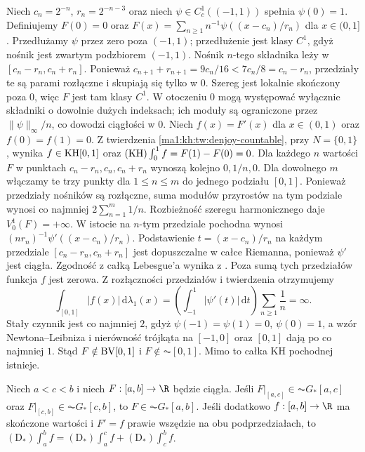 \begin{przyklad}
Niech $c_n=2^{-n}$, $r_n=2^{-n-3}$ oraz niech $\psi\in C_c^1((-1,1))$ spełnia $\psi(0)=1$. Definiujemy
$F(0)=0$ oraz $F(x)=\sum_{n\ge1}n^{-1}\psi((x-c_n)/r_n)$ dla $x\in(0,1]$. Przedłużamy $\psi$ przez zero poza $(-1,1)$; przedłużenie jest klasy $C^1$, gdyż nośnik jest zwartym podzbiorem $(-1,1)$. Nośnik $n$-tego składnika leży w $[c_n-r_n,c_n+r_n]$. Ponieważ $c_{n+1}+r_{n+1}=9c_n/16<7c_n/8=c_n-r_n$, przedziały te są parami rozłączne i skupiają się tylko w $0$. Szereg jest lokalnie skończony poza $0$, więc $F$ jest tam klasy $C^1$. W otoczeniu $0$ mogą występować wyłącznie składniki o dowolnie dużych indeksach; ich moduły są ograniczone przez $\|\psi\|_\infty/n$, co dowodzi ciągłości w $0$. Niech $f(x)=F'(x)$ dla $x\in(0,1)$ oraz $f(0)=f(1)=0$.
Z twierdzenia \ref{ma1:kh:tw:denjoy-countable}, przy $N=\{0,1\}$,
wynika $f\in\mathrm{KH}[0,1]$ oraz $(\mathrm{KH})\int_0^1f=F(1)-F(0)=0$.
Dla każdego $n$ wartości $F$ w punktach $c_n-r_n,c_n,c_n+r_n$
wynoszą kolejno $0,1/n,0$. Dla dowolnego $m$ włączamy te trzy
punkty dla $1\le n\le m$ do jednego podziału $[0,1]$.
Ponieważ przedziały nośników są rozłączne, suma modułów
przyrostów na tym podziale wynosi co najmniej
$2\sum_{n=1}^m1/n$. Rozbieżność szeregu harmonicznego
daje $V_0^1(F)=+\infty$. W istocie na $n$-tym przedziale pochodna wynosi $(nr_n)^{-1}\psi'((x-c_n)/r_n)$. Podstawienie $t=(x-c_n)/r_n$ na każdym przedziale
$[c_n-r_n,c_n+r_n]$ jest dopuszczalne w całce Riemanna,
ponieważ $\psi'$ jest ciągła. Zgodność z całką Lebesgue'a
wynika z .
Poza sumą tych przedziałów funkcja $f$ jest zerowa.
Z rozłączności przedziałów i twierdzenia
 otrzymujemy
\[
 \int_{[0,1]}|f(x)|\,\mathrm d\lambda_1(x)
 =\left(\int_{-1}^1|\psi'(t)|\,\mathrm dt\right)\sum_{n\ge1}\frac1n=\infty.
\]
Stały czynnik jest co najmniej $2$, gdyż $\psi(-1)=\psi(1)=0$, $\psi(0)=1$, a wzór Newtona--Leibniza i nierówność trójkąta na $[-1,0]$ oraz $[0,1]$ dają po co najmniej $1$. Stąd $F\notin\mathrm{BV}[0,1]$ i $F\notin\AC[0,1]$. Mimo to całka KH pochodnej istnieje.
\end{przyklad}
\begin{stwierdzenie}\label{ma1:kh:st:denjoy-sklejanie}\label{st:denjoy-sklejanie}
Niech $a<c<b$ i niech $F:[a,b]\to\R$ będzie ciągła. Jeśli $F|_{[a,c]}\in\AC G_*[a,c]$ oraz $F|_{[c,b]}\in\AC G_*[c,b]$, to $F\in\AC G_*[a,b]$. Jeśli dodatkowo $f:[a,b]\to\R$ ma skończone wartości i $F'=f$ prawie wszędzie na obu podprzedziałach, to $(\mathrm D_*)\int_a^b f=(\mathrm D_*)\int_a^c f+(\mathrm D_*)\int_c^b f$.
\end{stwierdzenie}
